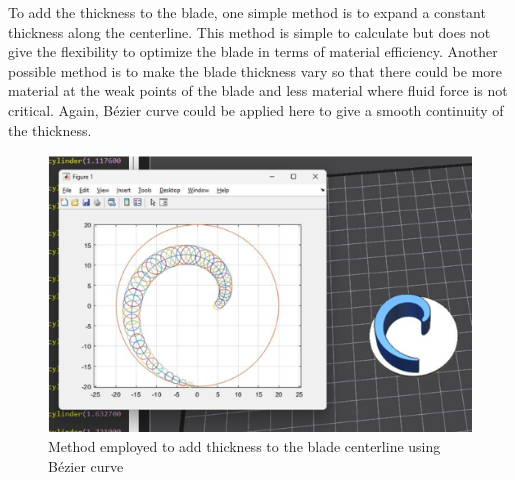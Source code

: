 \documentclass[11pt,a4paper]{scrartcl}
\begin{document}
To add the thickness to the blade, one simple method is to expand a constant thickness along the centerline. This method is simple to calculate but does not give the flexibility to optimize the blade in terms of material efficiency. Another possible method is to make the blade thickness vary so that there could be more material at the weak points of the blade and less material where fluid force is not critical. Again, Bézier curve could be applied here to give a smooth continuity of the thickness.
\begin{figure}[h]
    \centering
    \includegraphics[scale=1]{image9.png}
    \caption{ Method employed to add thickness to the blade centerline using Bézier curve }
    \label{fig:image4}
    
\end{figure}
\end{document}
